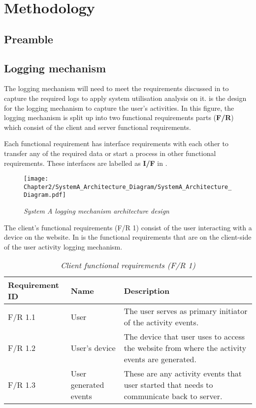 \chapter{Methodology}
\label{chap:2}

\section{Preamble}

\section{Logging mechanism}\label{Ch2:LoggingMechanism} The logging mechanism will need to meet the requirements discussed in  to capture the required logs to apply system utilisation analysis on it.  is the design for the logging mechanism to capture the user's activities. In this figure, the logging mechanism is split up into two functional requirements parts (\textbf{F/R}) which consist of the client and server functional requirements.\par Each functional requirement has interface requirements with each other to transfer any of the required data or start a process in other functional requirements. These interfaces are labelled as \textbf{I/F} in .

\begin{figure}[!htb] %
	\centering %
	\texttt{[image: Chapter2/SystemA\_Architecture\_Diagram/SystemA\_Architecture\_Diagram.pdf]}
	\caption[System A logging mechanism architecture design]
	{\textit{System A logging mechanism architecture design}}\label{fig:CH2_SystemA_Arch_Design}
\end{figure}

The client's functional requirements (F/R 1) consist of the user interacting with a device on the website. In  is the functional requirements that are on the client-side of the user activity logging mechanism.

\begin{table}[!htb]
	\centering
	\small
	\caption[Client functional requirements]
	{\textit{Client functional requirements (F/R 1)}}
	\label{tbl:Ch2_Client_Functional_Requirements}
	\begin{tabularx}{\textwidth}{|l|l|X|}
		\hline \textbf{Requirement ID} & \textbf{Name} & \textbf{Description} \\
		\hline F/R 1.1 & User & The user serves as primary initiator of the activity events.\\
		\hline F/R 1.2 & User's device & The device that user uses to access the website from where the activity events are generated.\\
		\hline F/R 1.3 & User generated events & These are any activity events that user started that needs to communicate back to server.\\
		\hline
	\end{tabularx}
\end{table}

